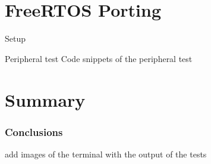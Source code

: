 \documentclass{beamer}
\begin{document}
\section{FreeRTOS Porting}


\footlinecolor{}
\begin{frame}[fragile]{Setup}
\end{frame}

\footlinecolor{}
\begin{frame}[fragile]{Peripheral test}
Code snippets of the peripheral test
\end{frame}


\section{Summary}

\begin{frame}
\frametitle{Conclusions}
add images of the terminal with the output of the tests
\end{frame}

\backmatter
\end{document}
